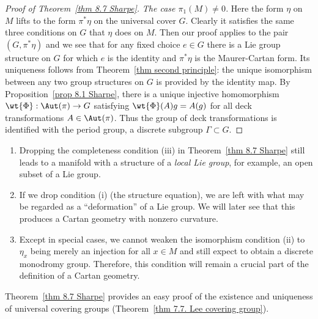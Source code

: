 \begin{proof}[Proof of Theorem~\ref{thm 8.7 Sharpe}]
    \emph{The case $\pi_1(M)\neq 0$.} Here the form $\eta$ on $M$ lifts to the form $\pi^\ast \eta$ on the universal cover $G$. Clearly it satisfies the same three conditions on $G$ that $\eta$ does on $M$. Then our proof applies to the pair $(G,\pi^\ast\eta)$ and we see that for any fixed choice $e\in G$ there is a Lie group structure on $G$ for which $e$ is the identity and $\pi^\ast\eta$ is the Maurer-Cartan form. Its uniqueness follows from Theorem~\ref{thm second principle}: the unique isomorphism between any two group structures on $G$ is provided by the identity map. By Proposition~\ref{prop 8.1 Sharpe}, there is a unique injective homomorphism $\wt{\Phi}:\Aut(\pi)\to G$ satisfying $\wt{\Phi}(A)g=A(g)$ for all deck transformations $A\in \Aut(\pi)$. Thus the group of deck transformations is identified with the period group, a discrete subgroup $\Gamma\subset G$.
\end{proof}

\begin{rem}
    \begin{enumerate}
        \item Dropping the completeness condition (iii) in Theorem~\ref{thm 8.7 Sharpe} still leads to a manifold with a structure of a \emph{local Lie group}, for example, an open subset of a Lie group.
        \item If we drop condition (i) (the structure equation), we are left with what may be regarded as a ``deformation'' of a Lie group. We will later see that this produces a Cartan geometry with nonzero curvature.
        \item Except in special cases, we cannot weaken the isomorphism condition (ii) to $\eta_x$ being merely an injection for all $x\in M$ and still expect to obtain a discrete monodromy group. Therefore, this condition will remain a crucial part of the definition of a Cartan geometry.
    \end{enumerate}
\end{rem}

Theorem~\ref{thm 8.7 Sharpe} provides an easy proof of the existence and uniqueness of universal covering groups (Theorem~\ref{thm 7.7. Lee covering group}).

